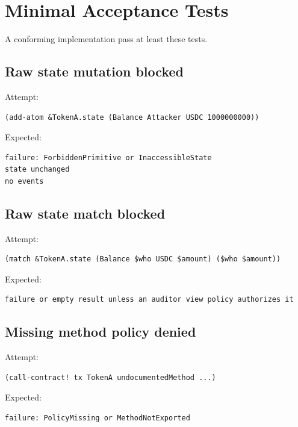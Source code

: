 \section{Minimal Acceptance Tests}

A conforming \SCS{} implementation \MUST{} pass at least these tests.

\subsection{Raw state mutation blocked}

Attempt:

\begin{lstlisting}
(add-atom &TokenA.state (Balance Attacker USDC 1000000000))
\end{lstlisting}

Expected:

\begin{lstlisting}
failure: ForbiddenPrimitive or InaccessibleState
state unchanged
no events
\end{lstlisting}

\subsection{Raw state match blocked}

Attempt:

\begin{lstlisting}
(match &TokenA.state (Balance $who USDC $amount) ($who $amount))
\end{lstlisting}

Expected:

\begin{lstlisting}
failure or empty result unless an auditor view policy authorizes it
\end{lstlisting}

\subsection{Missing method policy denied}

Attempt:

\begin{lstlisting}
(call-contract! tx TokenA undocumentedMethod ...)
\end{lstlisting}

Expected:

\begin{lstlisting}
failure: PolicyMissing or MethodNotExported
\end{lstlisting}

